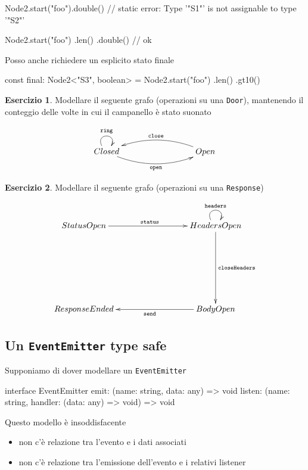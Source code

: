 \documentclass[12pt]{article}
\theoremstyle{definition}
\newtheorem{exercise}{Esercizio}[subsection]
\newenvironment{code}
  {\vspace{0.5cm} \VerbatimEnvironment\begin{typescriptcode}}
  {\end{typescriptcode} \vspace{0.2cm}}
\begin{document}
\begin{code}
Node2.start("foo").double()
// static error: Type '"S1"' is not assignable to type '"S2"'

Node2.start("foo")
  .len()
  .double() // ok
\end{code}

Posso anche richiedere un esplicito stato finale

\begin{code}
const final: Node2<"S3", boolean> = Node2.start("foo")
  .len()
  .gt10()
\end{code}

\begin{exercise}
Modellare il seguente grafo (operazioni su una \texttt{Door}), mantenendo il conteggio delle
volte in cui il campanello è stato suonato

\[
\xymatrixrowsep{3cm}
\xymatrixcolsep{3cm}
\xymatrix{
  Closed \ar@/_0.5cm/[r]_{\texttt{open}} \ar@(ul,ur)^{\texttt{ring}} & Open \ar@/_0.5cm/[l]_{\texttt{close}} \\
}
\]
\end{exercise}

\begin{exercise}
Modellare il seguente grafo (operazioni su una \texttt{Response})

\[
\xymatrixrowsep{3cm}
\xymatrixcolsep{3cm}
\xymatrix{
  StatusOpen \ar[r]^{\texttt{status}} & HeadersOpen \ar@(ul,ur)^{\texttt{headers}} \ar[d]^{\texttt{closeHeaders}} \\
  ResponseEnded & BodyOpen \ar[l]^{\texttt{send}} \\
}
\]
\end{exercise}

\subsection{Un \texttt{EventEmitter} type safe}

Supponiamo di dover modellare un \texttt{EventEmitter}

\begin{code}
interface EventEmitter {
  emit: (name: string, data: any) => void
  listen: (name: string, handler: (data: any) => void) => void
}
\end{code}

Questo modello è insoddisfacente

\begin{itemize}
  \item non c'è relazione tra l'evento e i dati associati
  \item non c'è relazione tra l'emissione dell'evento e i relativi listener
\end{itemize}
\end{document}
